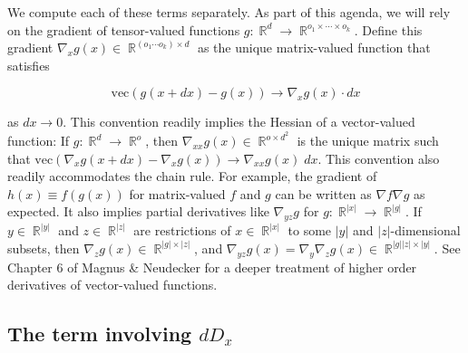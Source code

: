 \documentclass{article}
\newcommand{\R}{\mathop{\mathbb{R}}}
\begin{document}
We compute each of these terms separately. As part of this agenda, we will rely on the gradient of tensor-valued
functions $g:\R^d \to \R^{o_1 \times \cdots \times o_k}$. Define this gradient $\nabla_x g(x)\in \R^{(o_1 \cdots o_k)
        \times d}$ as the unique matrix-valued function that satisfies

\begin{equation}
    \mathrm{vec} \left(g(x+dx) - g(x)\right) \to \nabla_x g(x)
    \cdot dx
\end{equation}

as $dx \to 0$. This convention readily implies the Hessian of a vector-valued function: If $g:\R^d \to \R^o$, then
$\nabla_{xx} g(x) \in \R^{o\times d^2}$ is the unique matrix such that $\mathrm{vec} \left(\nabla_x g(x+dx) - \nabla_x
    g(x)\right) \to \nabla_{xx} g(x) \; dx$. This convention also readily accommodates the chain rule. For example, the
gradient of $h(x) \equiv f(g(x))$ for matrix-valued $f$ and $g$ can be written as $\nabla f \nabla g$ as expected. It
also implies partial derivatives like $\nabla_{yz} g$ for $g:\R^{|x|} \to \R^{|g|}$. If $y\in \R^{|y|}$ and $z\in
    \R^{|z|}$ are restrictions of $x \in \R^{|x|}$ to some $|y|$ and $|z|$-dimensional subsets, then $\nabla_z g(x) \in
    \R^{|g| \times |z|}$, and $\nabla_{yz} g(x) = \nabla_y \nabla_z g(x) \in \R^{|g||z| \times |y|}$. See Chapter 6 of
Magnus \& Neudecker \cite{magnus-neudecker} for a deeper treatment of higher order derivatives of vector-valued
functions.

\subsection{The term involving $dD_x$}
\end{document}
